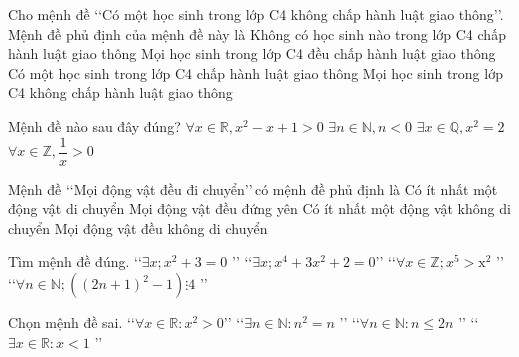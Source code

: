 \begin{ex}%
	Cho mệnh đề \lq\lq Có một học sinh trong lớp C4 không chấp hành luật  giao thông\rq\rq. Mệnh đề phủ định của mệnh đề này là
	\choice 
		{Không có học sinh nào trong lớp C4 chấp hành luật  giao thông}
		{\True Mọi học sinh  trong lớp C4 đều chấp hành luật giao thông}
		{Có một học sinh  trong lớp C4 chấp hành luật giao thông}
		{Mọi học sinh trong lớp C4 không  chấp hành luật giao thông}
\end{ex}

\begin{ex}%
	Mệnh đề nào sau  đây đúng?
	\choice 
		{\True $\forall x \in \mathbb{R}, x^2-x+1>0$} 
		{$\exists n \in  \mathbb{N}, n<0$}
		{$\exists x  \in \mathbb{Q}, x^2=2$}
		 {$\forall x \in \mathbb{Z}, \dfrac{1}{x}>0$}
\end{ex}

\begin{ex}%
	 Mệnh đề \lq\lq Mọi động vật đều đi chuyển\rq\rq \,có mệnh đề phủ định là
	\choice 
		{Có ít nhất một động vật di chuyển} 
		 {Mọi động vật đều đứng yên}
		{\True Có  ít nhất một động vật không di chuyển}
		{Mọi  động vật đều không di chuyển}
\end{ex}

\begin{ex}%
	Tìm  mệnh đề đúng.
	\choice 
		{\lq\lq  $\exists x; x^2+3=0$ \rq\rq}
		{\lq\lq $\exists x;  x^4+3x^2+2=0 $\rq\rq}
		{\True \lq\lq $\forall x \in \mathbb{Z}; x^5>\mathrm{x}^2$  \rq\rq}
		{\lq\lq $\forall n \in  \mathbb{N};\left((2 n+1)^2-1\right) \vdots 4$ \rq\rq}
\end{ex}

\begin{ex}%
	 Chọn mệnh đề sai.
	 \choice
		{\True \lq\lq $\forall x \in \mathbb{R}\colon x^2>0 $\rq\rq} 
		{\lq\lq $\exists n \in  \mathbb{N}: n^2=n$ \rq\rq}
		 {\lq\lq $\forall n \in \mathbb{N}: n \leq 2 n$ \rq\rq}
		 {\lq\lq $\exists x \in \mathbb{R}\colon x<1$ \rq\rq}
\end{ex}

